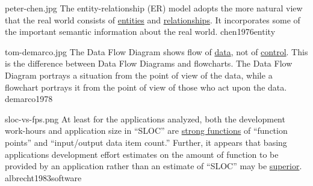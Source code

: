 \documentclass{article}
\begin{document}

\qte
  {peter-chen.jpg}
  {The entity-relationship (ER) model adopts the more natural view that the real world consists of \ul{entities} and \ul{relationships}. It incorporates some of the important semantic information about the real world.}
  {chen1976entity}


\qte
  {tom-demarco.jpg}
  {The Data Flow Diagram shows flow of \ul{data}, not of \ul{control}. This is the difference between Data Flow Diagrams and flowcharts. The Data Flow Diagram portrays a situation from the point of view of the data, while a flowchart portrays it from the point of view of those who act upon the data.}
  {demarco1978}


\qte
  {sloc-vs-fps.png}
  {At least for the applications analyzed, both the development work-hours and application size in ``SLOC'' are \ul{strong functions} of ``function points'' and ``input/output data item count.'' Further, it appears that basing applications development effort estimates on the amount of function to be provided by an application rather than an estimate of ``SLOC'' may be \ul{superior}.}
  {albrecht1983software}
\end{document}
